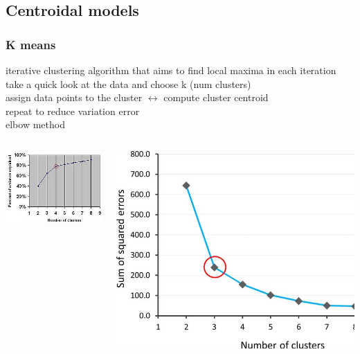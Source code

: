 \documentclass{beamer}
\begin{document}
\subsection{Centroidal models}
\begin{frame}\frametitle{K means}
iterative clustering algorithm that aims to find local maxima in each iteration\\
take a quick look at the data and choose k (num clusters)\\
assign data points to the cluster $\leftrightarrow$
compute cluster centroid\\
repeat to reduce variation error\\
elbow method
\begin{columns}
	\begin{column}{.5\textwidth}
		\includegraphics[scale=0.5]{kmeans_1}
	\end{column}
	\begin{column}{.5\textwidth}
		\includegraphics[scale=0.2]{kmeans_2}
	\end{column}
\end{columns}
\end{frame}
\end{document}
